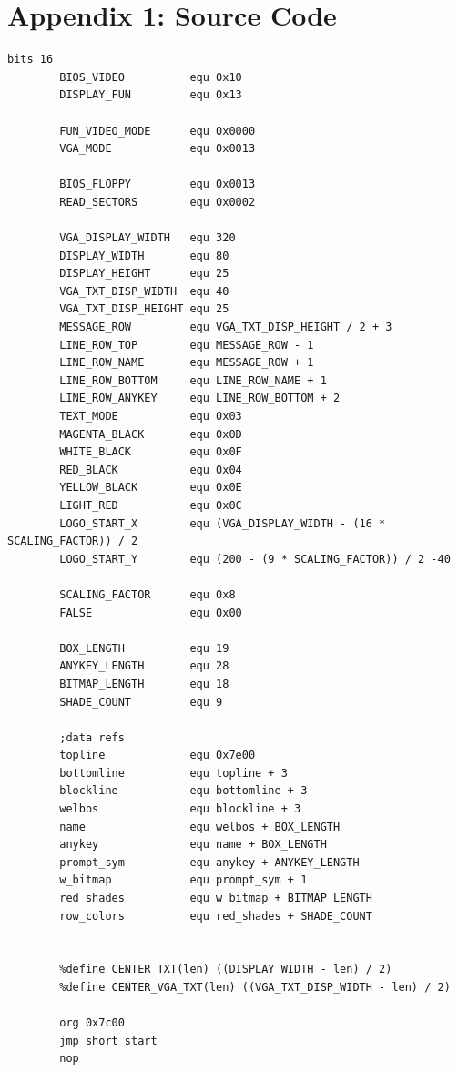 \documentclass{article}
\begin{document}
    \section{Appendix 1: Source Code}\label{sec:appendix_1}
    \begin{lstlisting}[caption={os623V02.asm listing}, captionpos=t]
       bits 16
        BIOS_VIDEO          equ 0x10
        DISPLAY_FUN         equ 0x13

        FUN_VIDEO_MODE      equ 0x0000
        VGA_MODE            equ 0x0013

        BIOS_FLOPPY         equ 0x0013
        READ_SECTORS        equ 0x0002

        VGA_DISPLAY_WIDTH   equ 320
        DISPLAY_WIDTH       equ 80
        DISPLAY_HEIGHT      equ 25
        VGA_TXT_DISP_WIDTH  equ 40
        VGA_TXT_DISP_HEIGHT equ 25
        MESSAGE_ROW         equ VGA_TXT_DISP_HEIGHT / 2 + 3
        LINE_ROW_TOP        equ MESSAGE_ROW - 1
        LINE_ROW_NAME       equ MESSAGE_ROW + 1
        LINE_ROW_BOTTOM     equ LINE_ROW_NAME + 1
        LINE_ROW_ANYKEY     equ LINE_ROW_BOTTOM + 2
        TEXT_MODE           equ 0x03
        MAGENTA_BLACK       equ 0x0D
        WHITE_BLACK         equ 0x0F
        RED_BLACK           equ 0x04
        YELLOW_BLACK        equ 0x0E
        LIGHT_RED           equ 0x0C
        LOGO_START_X        equ (VGA_DISPLAY_WIDTH - (16 * SCALING_FACTOR)) / 2
        LOGO_START_Y        equ (200 - (9 * SCALING_FACTOR)) / 2 -40

        SCALING_FACTOR      equ 0x8
        FALSE               equ 0x00

        BOX_LENGTH          equ 19
        ANYKEY_LENGTH       equ 28
        BITMAP_LENGTH       equ 18
        SHADE_COUNT         equ 9

        ;data refs
        topline             equ 0x7e00
        bottomline          equ topline + 3
        blockline           equ bottomline + 3
        welbos              equ blockline + 3
        name                equ welbos + BOX_LENGTH
        anykey              equ name + BOX_LENGTH
        prompt_sym          equ anykey + ANYKEY_LENGTH
        w_bitmap            equ prompt_sym + 1
        red_shades          equ w_bitmap + BITMAP_LENGTH
        row_colors          equ red_shades + SHADE_COUNT


        %define CENTER_TXT(len) ((DISPLAY_WIDTH - len) / 2)
        %define CENTER_VGA_TXT(len) ((VGA_TXT_DISP_WIDTH - len) / 2)

        org 0x7c00
        jmp short start
        nop


\end{lstlisting}
\end{document}
